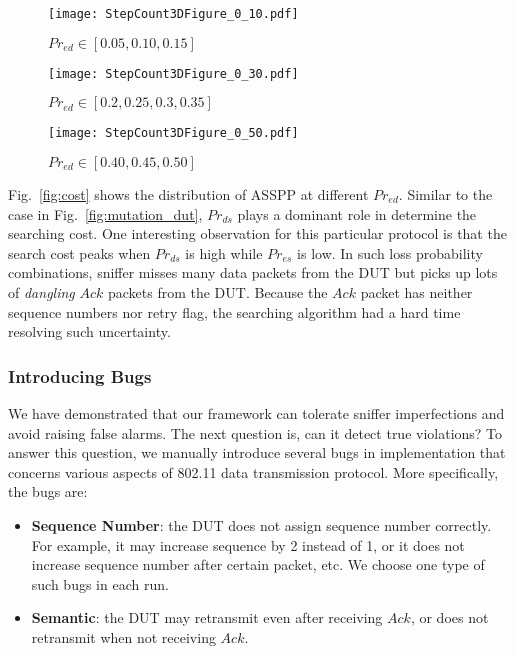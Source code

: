 \begin{figure*}[t!]
  \centering
  \begin{subfigure}{0.33\textwidth}
    \centering
    \texttt{[image: StepCount3DFigure\_0\_10.pdf]}
    \caption{$Pr_{ed} \in [0.05, 0.10, 0.15]$}
  \end{subfigure}\hspace*{0.01\textwidth}
  \begin{subfigure}{0.33\textwidth}
    \centering
    \texttt{[image: StepCount3DFigure\_0\_30.pdf]}
    \caption{$Pr_{ed} \in [0.2, 0.25, 0.3, 0.35]$}
  \end{subfigure}\hspace*{0.01\textwidth}
  \begin{subfigure}{0.33\textwidth}
    \centering
    \texttt{[image: StepCount3DFigure\_0\_50.pdf]}
    \caption{$Pr_{ed} \in [0.40, 0.45, 0.50]$}
  \end{subfigure}
  \caption{\textbf{Average Searching Step Per Packet.} For each data point, the mean of 5 runs
  is used.}
  \label{fig:cost}
\end{figure*}


Fig.~\ref{fig:cost} shows the distribution of ASSPP at different $Pr_{ed}$.
Similar to the case in Fig.~\ref{fig:mutation_dut}, $Pr_{ds}$ plays a dominant
role in determine the searching cost. One interesting observation for this
particular protocol is that the
search cost peaks when $Pr_{ds}$ is high while $Pr_{es}$ is low. In such loss
probability combinations, sniffer misses many data packets from the DUT but
picks up lots of \textit{dangling} $Ack$ packets from the DUT. Because the $Ack$
packet has neither sequence numbers nor retry flag, the searching algorithm had
a hard time resolving such uncertainty.

\subsubsection{Introducing Bugs}

We have demonstrated that our framework can tolerate sniffer imperfections and
avoid raising false alarms.  The next question is, can it detect true
violations?  To answer this question, we manually introduce several bugs in
\ns{} implementation that concerns various aspects of 802.11 data transmission
protocol.  More specifically, the bugs are:

\begin{itemize}
  \item \textbf{Sequence Number}: the DUT does not assign sequence number
    correctly. For example, it may increase sequence by 2 instead of 1, or it
    does not increase sequence number after certain packet, etc. We choose one
    type of such bugs in each run.
  \item \textbf{Semantic}: the DUT may retransmit even
    after receiving $Ack$, or does not retransmit when not receiving $Ack$.
\end{itemize}

